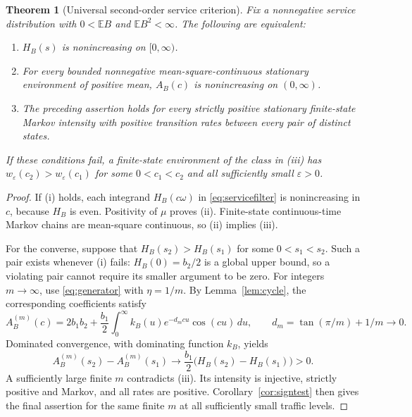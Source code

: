 \documentclass[11pt,reqno]{amsart}
\numberwithin{equation}{section}
\theoremstyle{plain}
\newtheorem{theorem}{Theorem}[section]
\theoremstyle{definition}
\newcommand{\E}{\mathbb E}
\newcommand{\1}{\mathbf 1}
\newcommand{\eps}{\varepsilon}
\begin{document}
\begin{theorem}[Universal second-order service criterion]\label{thm:servicecriterion}
Fix a nonnegative service distribution with $0<\E B$ and $\E B^2<\infty$. The following are equivalent:
\begin{enumerate}
\item $H_B(s)$ is nonincreasing on $[0,\infty)$.
\item For every bounded nonnegative mean-square-continuous stationary environment of positive mean, $A_B(c)$ is nonincreasing on $(0,\infty)$.
\item The preceding assertion holds for every strictly positive stationary finite-state Markov intensity with positive transition rates between every pair of distinct states.
\end{enumerate}
If these conditions fail, a finite-state environment of the class in (iii) has $w_\eps(c_2)>w_\eps(c_1)$ for some $0<c_1<c_2$ and all sufficiently small $\eps>0$.
\end{theorem}
\begin{proof}
If (i) holds, each integrand $H_B(c\omega)$ in \eqref{eq:servicefilter} is nonincreasing in $c$, because $H_B$ is even. Positivity of $\mu$ proves (ii). Finite-state continuous-time Markov chains are mean-square continuous, so (ii) implies (iii).

For the converse, suppose that $H_B(s_2)>H_B(s_1)$ for some $0<s_1<s_2$. Such a pair exists whenever (i) fails: $H_B(0)=b_2/2$ is a global upper bound, so a violating pair cannot require its smaller argument to be zero. For integers $m\to\infty$, use \eqref{eq:generator} with $\eta=1/m$. By Lemma~\ref{lem:cycle}, the corresponding coefficients satisfy
\[
 A_B^{(m)}(c)=2b_1b_2+\frac{b_1}{2}
       \int_0^\infty k_B(u)e^{-d_mcu}\cos(cu)\,du,
 \qquad d_m=\tan(\pi/m)+1/m\longrightarrow0.
\]
Dominated convergence, with dominating function $k_B$, yields
\[
 A_B^{(m)}(s_2)-A_B^{(m)}(s_1)
 \longrightarrow\frac{b_1}{2}\bigl(H_B(s_2)-H_B(s_1)\bigr)>0.
\]
A sufficiently large finite $m$ contradicts (iii). Its intensity is injective, strictly positive and Markov, and all rates are positive. Corollary~\ref{cor:signtest} then gives the final assertion for the same finite $m$ at all sufficiently small traffic levels.
\end{proof}
\end{document}
